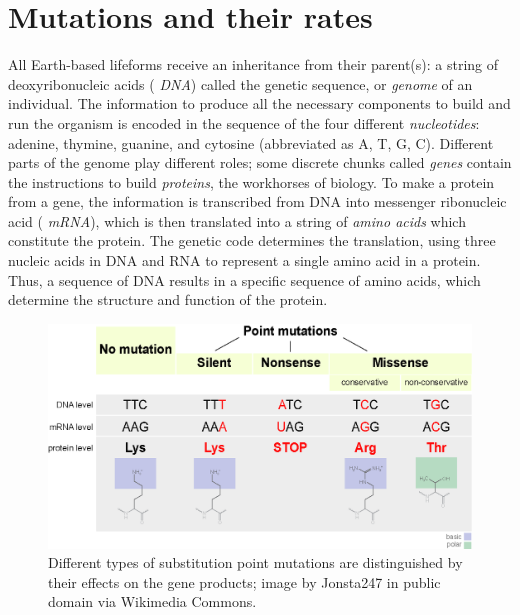 \documentclass[
  letterpaper,
  DIV=11,
  numbers=noendperiod]{scrreprt}
\begin{document}
\hypertarget{mutations-and-their-rates}{%
\section{Mutations and their rates}\label{mutations-and-their-rates}}

\label{sec:bio3}

All Earth-based lifeforms receive an inheritance from their parent(s): a
string of deoxyribonucleic acids ( \emph{DNA}) called the
genetic sequence, or  \emph{genome} of an individual. The
information to produce all the necessary components to build and run the
organism is encoded in the sequence of the four different
 \emph{nucleotides}: adenine, thymine, guanine, and
cytosine (abbreviated as A, T, G, C). Different parts of the genome play
different roles; some discrete chunks called \emph{genes} contain the
instructions to build  \emph{proteins}, the workhorses
of biology. To make a protein from a gene, the information is
transcribed from DNA into messenger ribonucleic acid (
\emph{mRNA}), which is then translated into a string of
 \emph{amino acids} which constitute the protein. The
genetic code determines the translation, using three nucleic acids in
DNA and RNA to represent a single amino acid in a protein. Thus, a
sequence of DNA results in a specific sequence of amino acids, which
determine the structure and function of the protein.

\begin{figure}

{\centering \includegraphics{./ch3/Point_mutations-en.png}

}

\caption{Different types of substitution 
point mutations are distinguished by their effects on the gene products;
image by Jonsta247 in public domain via Wikimedia Commons.}

\end{figure}
\end{document}

